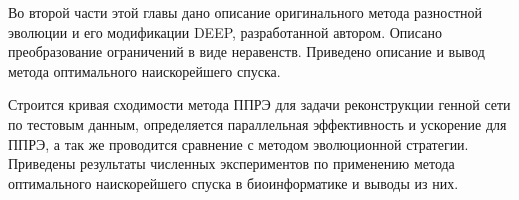 Во второй части этой главы дано описание оригинального метода разностной эволюции и его модификации DEEP, разработанной автором. Описано преобразование ограничений в виде неравенств. Приведено описание и вывод метода оптимального наискорейшего спуска.

Строится кривая сходимости метода ППРЭ для задачи реконструкции генной сети по тестовым данным, определяется параллельная эффективность и ускорение для ППРЭ, а так же проводится сравнение с методом эволюционной стратегии. Приведены результаты численных экспериментов по применению метода оптимального наискорейшего спуска в биоинформатике и выводы из них.


